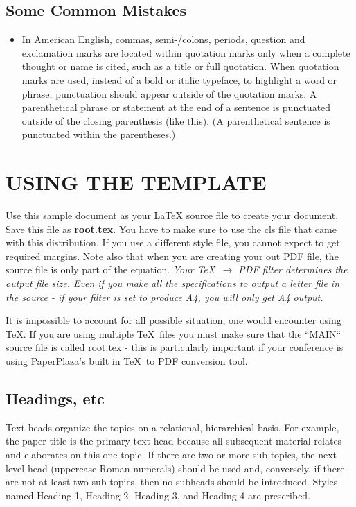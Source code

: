 \documentclass[letterpaper, 10 pt, conference]{ieeeconf}  %
\begin{document}
\subsection{Some Common Mistakes}
\begin{itemize}



\item In American English, commas, semi-/colons, periods, question and exclamation marks are located within quotation marks only when a complete thought or name is cited, such as a title or full quotation. When quotation marks are used, instead of a bold or italic typeface, to highlight a word or phrase, punctuation should appear outside of the quotation marks. A parenthetical phrase or statement at the end of a sentence is punctuated outside of the closing parenthesis (like this). (A parenthetical sentence is punctuated within the parentheses.)

\end{itemize}


\section{USING THE TEMPLATE}

Use this sample document as your LaTeX source file to create your document. Save this file as {\bf root.tex}. You have to make sure to use the cls file that came with this distribution. If you use a different style file, you cannot expect to get required margins. Note also that when you are creating your out PDF file, the source file is only part of the equation. {\it Your \TeX\ $\rightarrow$ PDF filter determines the output file size. Even if you make all the specifications to output a letter file in the source - if your filter is set to produce A4, you will only get A4 output. }

It is impossible to account for all possible situation, one would encounter using \TeX. If you are using multiple \TeX\ files you must make sure that the ``MAIN`` source file is called root.tex - this is particularly important if your conference is using PaperPlaza's built in \TeX\ to PDF conversion tool.

\subsection{Headings, etc}

Text heads organize the topics on a relational, hierarchical basis. For example, the paper title is the primary text head because all subsequent material relates and elaborates on this one topic. If there are two or more sub-topics, the next level head (uppercase Roman numerals) should be used and, conversely, if there are not at least two sub-topics, then no subheads should be introduced. Styles named Heading 1, Heading 2, Heading 3, and Heading 4 are prescribed.
\end{document}
